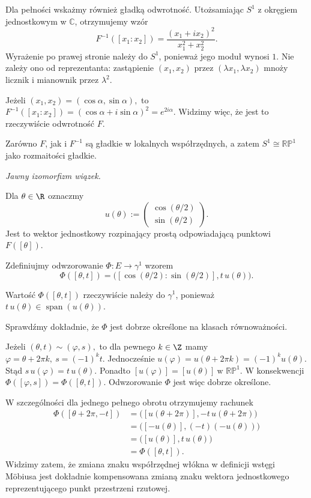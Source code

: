 \begin{przyklad}
Dla pełności wskażmy również gładką
odwrotność. Utożsamiając $S^1$
z okręgiem jednostkowym w $\mathbb C$,
otrzymujemy wzór
\[
\boxed{
F^{-1}([x_1:x_2])
=
\frac{(x_1+ix_2)^2}{x_1^2+x_2^2}.
}
\]
Wyrażenie po prawej stronie należy do $S^1$,
ponieważ jego moduł wynosi $1$.
Nie zależy ono od reprezentanta:
zastąpienie $(x_1,x_2)$ przez
$(\lambda x_1,\lambda x_2)$ mnoży
licznik i mianownik przez $\lambda^2$.

Jeżeli
$
(x_1,x_2)=(\cos\alpha,\sin\alpha),
$
to
$
F^{-1}([x_1:x_2])
=(\cos\alpha+i\sin\alpha)^2
=e^{2i\alpha}.
$
Widzimy więc, że jest to rzeczywiście
odwrotność $F$.

Zarówno $F$, jak i $F^{-1}$
są gładkie w lokalnych współrzędnych,
a zatem
$
S^1\cong\mathbb{RP}^1
$
jako rozmaitości gładkie.

\medskip
\emph{Jawny izomorfizm wiązek.}

Dla $\theta\in\R$ oznaczmy
\[
u(\theta)
:=
\begin{pmatrix}
\cos(\theta/2)\\
\sin(\theta/2)
\end{pmatrix}.
\]
Jest to wektor jednostkowy rozpinający
prostą odpowiadającą punktowi $F([\theta])$.

Zdefiniujmy odwzorowanie
$
\Phi\colon E\longrightarrow\gamma^1
$
wzorem
\[
\Phi([\theta,t])
=
\bigl(
[\cos(\theta/2):\sin(\theta/2)],
t\,u(\theta)
\bigr).
\]

Wartość $\Phi([\theta,t])$ rzeczywiście
należy do $\gamma^1$, ponieważ
$
t\,u(\theta)
\in\operatorname{span}(u(\theta)).
$

Sprawdźmy dokładnie, że $\Phi$
jest dobrze określone na klasach równoważności.

Jeżeli
$
(\theta,t)\sim(\varphi,s),
$
to dla pewnego $k\in\Z$ mamy
$
\varphi=\theta+2\pi k,
\ 
s=(-1)^k t.
$
Jednocześnie
$
u(\varphi)
=
u(\theta+2\pi k)
=
(-1)^k u(\theta).
$
Stąd
$
s\,u(\varphi)=t\,u(\theta).
$
Ponadto
$
[u(\varphi)]=[u(\theta)]
\ \text{w }\mathbb{RP}^1.
$
W konsekwencji
$
\Phi([\varphi,s])=\Phi([\theta,t]).
$
Odwzorowanie $\Phi$ jest więc
dobrze określone.

W szczególności dla jednego pełnego obrotu
otrzymujemy rachunek
\[
\begin{aligned}
\Phi([\theta+2\pi,-t])
&=
\bigl([u(\theta+2\pi)],-t\,u(\theta+2\pi)\bigr)\\
&=
\bigl([-u(\theta)],(-t)(-u(\theta))\bigr)\\
&=
\bigl([u(\theta)],t\,u(\theta)\bigr)\\
&=\Phi([\theta,t]).
\end{aligned}
\]
Widzimy zatem, że zmiana znaku
współrzędnej włókna w definicji wstęgi Möbiusa
jest dokładnie kompensowana zmianą znaku
wektora jednostkowego reprezentującego
punkt przestrzeni rzutowej.


\end{przyklad}
